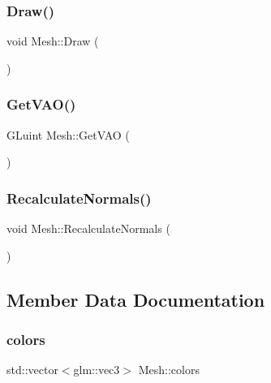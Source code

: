 \subsubsection{\texorpdfstring{Draw()}{Draw()}}
{\footnotesize\ttfamily void Mesh\+::\+Draw (\begin{DoxyParamCaption}{ }\end{DoxyParamCaption})}

\mbox{\label{class_mesh_ad4917bc56c71f31974af4be3eb90a390}} 
\subsubsection{\texorpdfstring{GetVAO()}{GetVAO()}}
{\footnotesize\ttfamily G\+Luint Mesh\+::\+Get\+V\+AO (\begin{DoxyParamCaption}{ }\end{DoxyParamCaption})\hspace{0.3cm}{\ttfamily [inline]}}

\mbox{\label{class_mesh_a2688a608e0185faef28105fae57ad76d}} 
\subsubsection{\texorpdfstring{RecalculateNormals()}{RecalculateNormals()}}
{\footnotesize\ttfamily void Mesh\+::\+Recalculate\+Normals (\begin{DoxyParamCaption}{ }\end{DoxyParamCaption})}



\subsection{Member Data Documentation}
\mbox{\label{class_mesh_a484b6f05575dbac43b3f5de817f90069}} 
\subsubsection{\texorpdfstring{colors}{colors}}
{\footnotesize\ttfamily std\+::vector$<$glm\+::vec3$>$ Mesh\+::colors}

\mbox{\label{class_mesh_a5e55b84c6c967608bcf23ed7d68e4215}} 
